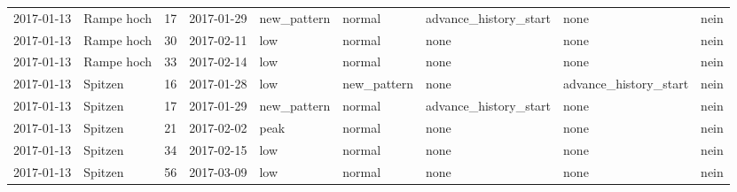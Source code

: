 \begin{tabular}{llrllllll}
2017-01-13 & Rampe hoch & 17 & 2017-01-29 & new\_pattern & normal & advance\_history\_start & none & nein \\
2017-01-13 & Rampe hoch & 30 & 2017-02-11 & low & normal & none & none & nein \\
2017-01-13 & Rampe hoch & 33 & 2017-02-14 & low & normal & none & none & nein \\
2017-01-13 & Spitzen & 16 & 2017-01-28 & low & new\_pattern & none & advance\_history\_start & nein \\
2017-01-13 & Spitzen & 17 & 2017-01-29 & new\_pattern & normal & advance\_history\_start & none & nein \\
2017-01-13 & Spitzen & 21 & 2017-02-02 & peak & normal & none & none & nein \\
2017-01-13 & Spitzen & 34 & 2017-02-15 & low & normal & none & none & nein \\
2017-01-13 & Spitzen & 56 & 2017-03-09 & low & normal & none & none & nein \\
\bottomrule
\end{tabular}
